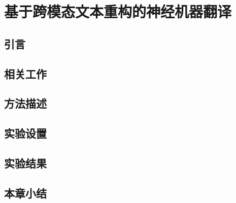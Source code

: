 \chapter{基于跨模态文本重构的神经机器翻译}

\section{引言}

\section{相关工作}

\section{方法描述}

\section{实验设置}

\section{实验结果}

\section{本章小结}
